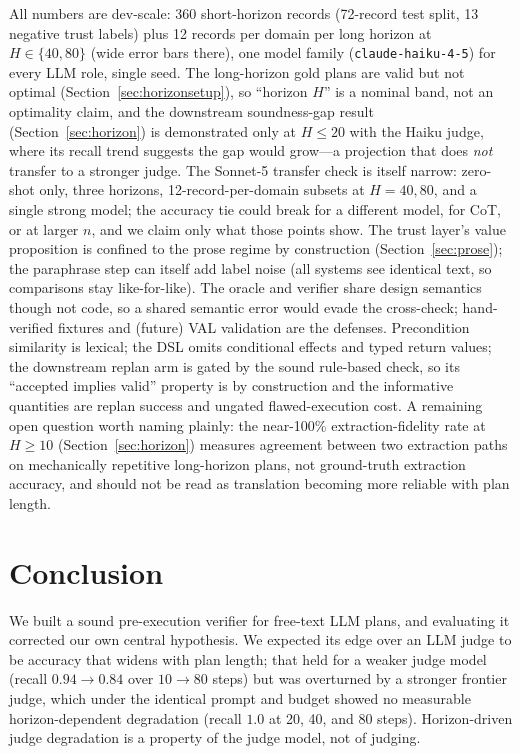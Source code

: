 \documentclass[letterpaper]{article}
\begin{document}
All numbers are dev-scale: 360 short-horizon records (72-record test
split, 13 negative trust labels) plus 12 records per domain per long
horizon at $H{\in}\{40,80\}$ (wide error bars there), one model family
(\texttt{claude-haiku-4-5}) for every LLM role, single seed. The
long-horizon gold plans are valid but not optimal
(Section~\ref{sec:horizonsetup}), so ``horizon $H$'' is a nominal band, not
an optimality claim, and the downstream soundness-gap result
(Section~\ref{sec:horizon}) is demonstrated only at $H{\leq}20$ with the
Haiku judge, where its recall trend suggests the gap would grow---a
projection that does \emph{not} transfer to a stronger judge. The
Sonnet-5 transfer check is itself narrow: zero-shot only, three horizons,
12-record-per-domain subsets at $H{=}40,80$, and a single strong model; the
accuracy tie could break for a different model, for CoT, or at larger $n$,
and we claim only what those points show. The trust
layer's value proposition is confined to the prose regime by construction
(Section~\ref{sec:prose}); the paraphrase step can itself add label noise
(all systems see identical text, so comparisons stay like-for-like). The
oracle and verifier share design semantics though not code, so a shared
semantic error would evade the cross-check; hand-verified fixtures and
(future) \textsc{VAL} \citep{howey2004val} validation are the defenses.
Precondition similarity is lexical; the DSL omits conditional effects and
typed return values; the downstream replan arm is gated by the sound
rule-based check, so its ``accepted implies valid'' property is by
construction and the informative quantities are replan success and
ungated flawed-execution cost. A remaining open question worth naming
plainly: the near-100\% extraction-fidelity rate at $H{\geq}10$
(Section~\ref{sec:horizon}) measures agreement between two extraction
paths on mechanically repetitive long-horizon plans, not ground-truth
extraction accuracy, and should not be read as translation becoming more
reliable with plan length.

\section{Conclusion}

We built a sound pre-execution verifier for free-text LLM plans, and
evaluating it corrected our own central hypothesis. We expected its edge over
an LLM judge to be accuracy that widens with plan length; that held for a
weaker judge model (recall $0.94\!\to\!0.84$ over $10\!\to\!80$ steps) but
was overturned by a stronger frontier judge, which under the identical prompt
and budget showed no measurable horizon-dependent degradation (recall $1.0$
at 20, 40, and 80 steps). Horizon-driven judge degradation is a property of
the judge model, not of judging.
\end{document}
